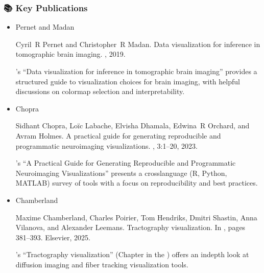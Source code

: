 \documentclass[letterpaper,10pt,english]{jupyterBook}
\begin{document}
\subsubsection{📚 Key Publications}
\label{\detokenize{chapters/03/03b_visualization-tools:key-publications}}\begin{itemize}
\item {} 
\sphinxAtStartPar
Pernet and Madan%
\begin{footnote}[9]\sphinxAtStartFootnote
Cyril R Pernet and Christopher R Madan. Data visualization for inference in tomographic brain imaging. , 2019.
%
\end{footnote}’s “Data visualization for inference in tomographic brain imaging” provides a structured guide to visualization choices for brain imaging, with helpful discussions on colormap selection and interpretability.

\item {} 
\sphinxAtStartPar
Chopra %
\begin{footnote}[10]\sphinxAtStartFootnote
Sidhant Chopra, Loïc Labache, Elvisha Dhamala, Edwina R Orchard, and Avram Holmes. A practical guide for generating reproducible and programmatic neuroimaging visualizations. , 3:1–20, 2023.
%
\end{footnote}’s “A Practical Guide for Generating Reproducible and Programmatic Neuroimaging Visualizations” presents a cross\sphinxhyphen{}language (R, Python, MATLAB) survey of tools with a focus on reproducibility and best practices.

\item {} 
\sphinxAtStartPar
Chamberland %
\begin{footnote}[11]\sphinxAtStartFootnote
Maxime Chamberland, Charles Poirier, Tom Hendriks, Dmitri Shastin, Anna Vilanova, and Alexander Leemans. Tractography visualization. In , pages 381–393. Elsevier, 2025.
%
\end{footnote}’s “Tractography visualization” (Chapter in the ) offers an in\sphinxhyphen{}depth look at diffusion imaging and fiber tracking visualization tools.

\end{itemize}
\end{document}
